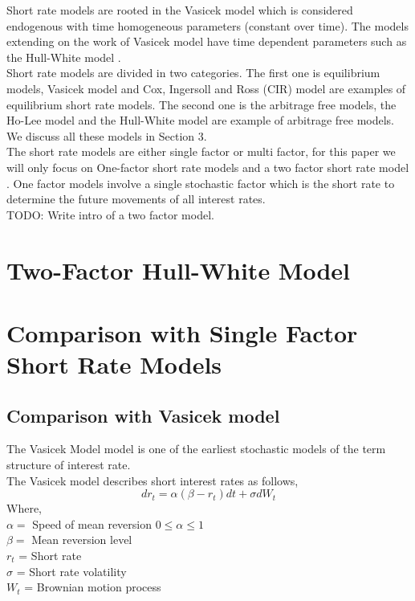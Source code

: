 \documentclass{article}
\begin{document}
Short rate models are rooted in the Vasicek model \cite{BN1} which is considered endogenous with time homogeneous parameters (constant over time).  The models extending on the work of Vasicek model have time dependent parameters such as the Hull-White model \cite{HW1}. \\

Short rate models are divided in two categories.  The first one is equilibrium models, Vasicek model and Cox, Ingersoll and Ross (CIR) model are examples of equilibrium short rate models.  The second one is the arbitrage free models, the Ho-Lee model and the Hull-White model are example of arbitrage free models.  We discuss all these models in Section 3. \\ 

The short rate models are either single factor or multi factor, for this paper we will only focus on One-factor short rate models and a two factor short rate model \cite{BA1}.  One factor  models involve a single stochastic factor which is the short rate to determine the future movements of all interest rates.  \\

TODO: Write intro of a two factor model.


\section{Two-Factor Hull-White Model 
}


\section{Comparison with Single Factor Short Rate Models
}

\subsection{Comparison with Vasicek model
}
The Vasicek Model \cite{Vas1} model is one of the earliest stochastic models of the term structure of interest rate.\\

The Vasicek model describes short interest rates as follows,
 \[
dr_t = \alpha(\beta - r_t) dt + \sigma dW_t
\]
Where,\\
$\alpha =$ Speed of mean reversion $0 \leq \alpha \leq 1 $ \\
$\beta =$ Mean reversion level  \\
$r_t$ = Short rate  \\
$\sigma$ = Short rate volatility \\
$W_t$ = Brownian motion process  \\
\end{document}
